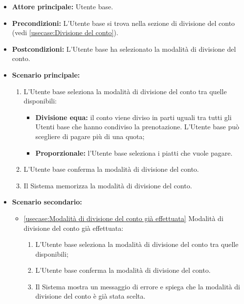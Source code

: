 \label{usecase:Selezione della modalità di divisione del conto}
\begin{itemize}
	\item \textbf{Attore principale:} Utente base.
	
	\item \textbf{Precondizioni:} L'Utente base si trova nella sezione di divisione del conto (vedi \autoref{usecase:Divisione del conto}).

	\item \textbf{Postcondizioni:}
	      L'Utente base ha selezionato la modalità di divisione del conto.
	\item \textbf{Scenario principale:}
	      \begin{enumerate}
		      \item L'Utente base seleziona la modalità di divisione del conto
		            tra quelle disponibili:
					\begin{itemize}
						\item \textbf{Divisione equa:} il conto viene diviso in parti
							  uguali tra tutti gli Utenti base che hanno condiviso la
							  prenotazione. L'Utente base può scegliere di pagare più di
							  una quota;
		  
						\item \textbf{Proporzionale:} l'Utente base seleziona i piatti che vuole
							  pagare.
					\end{itemize}

		      \item L'Utente base conferma la modalità di divisione del conto.

		      \item Il Sistema memorizza la modalità di divisione del conto.
	      \end{enumerate}

	\item \textbf{Scenario secondario:}
		  \begin{itemize}
			  \item \autoref{usecase:Modalità di divisione del conto già effettuata} Modalità di divisione del conto già effettuata:
				\begin{enumerate}
					\item L'Utente base seleziona la modalità di divisione del conto
						tra quelle disponibili;
	
					\item L'Utente base conferma la modalità di divisione del conto.
	
					\item Il Sistema mostra un messaggio di errore e spiega che la
						modalità di divisione del conto è già stata scelta.
				\end{enumerate}
		  \end{itemize}

\end{itemize}


